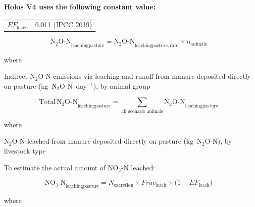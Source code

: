 \bigskip
\noindent\textbf{Holos V4 uses the following constant value:}

\smallskip
\noindent\begin{tabular}{@{}ll@{}}
    $\mathit{EF}_{\mathrm{leach}}$ & 0.011 (IPCC 2019) \\
\end{tabular}

\begin{equation}
    \mathrm{N_2O\text{-}N}_{\mathrm{leachingpasture}}
        = \mathrm{N_2O\text{-}N}_{\mathrm{leachingpasture,rate}}
          \times n_{\mathrm{animals}}
    \tag{Eq.\ 5.4.4-2}
\end{equation}

\noindent where

\begin{description}[font=\normalfont, leftmargin=12em, style=nextline, nosep]
    \item[$\mathrm{N_2O\text{-}N}_{\mathrm{leachingpasture}}$]
        Indirect N$_2$O-N emissions via leaching and runoff from manure
        deposited directly on pasture (kg~N$_2$O-N~day$^{-1}$), by animal group
\end{description}

\begin{equation}
    \mathrm{Total\,N_2O\text{-}N}_{\mathrm{leachingpasture}}
        = \sum_{\text{all scenario animals}}
          \mathrm{N_2O\text{-}N}_{\mathrm{leachingpasture}}
    \tag{Eq.\ 5.4.4-3}
\end{equation}

\noindent where

\begin{description}[font=\normalfont, leftmargin=12em, style=nextline, nosep]
    \item[$\mathrm{Total\,N_2O\text{-}N}_{\mathrm{leachingpasture}}$]
        N$_2$O-N leached from manure deposited directly on pasture
        (kg~N$_2$O-N), by livestock type
\end{description}

\noindent To estimate the actual amount of NO$_3$-N leached:

\begin{equation}
    \mathrm{NO_3\text{-}N}_{\mathrm{leachingpasture}}
        = N_{\mathrm{excretion}}
          \times \mathit{Frac}_{\mathrm{leach}}
          \times \bigl(1 - \mathit{EF}_{\mathrm{leach}}\bigr)
    \tag{Eq.\ 5.4.4-4}
\end{equation}

\noindent where

